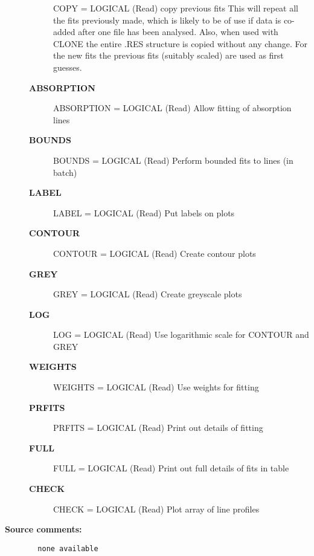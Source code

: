 \begin{description}
\begin{description}
   COPY = LOGICAL (Read)
        copy previous fits
        This will repeat all the fits previously made, which
        is likely to be of use if data is co-added after one
        file has been analysed. Also, when used with CLONE
        the entire .RES structure is copied without any change.
        For the new fits the previous fits (suitably scaled)
        are used as first guesses.
\item [{\bf ABSORPTION}]
   ABSORPTION = LOGICAL (Read)
        Allow fitting of absorption lines
\item [{\bf BOUNDS}]
   BOUNDS = LOGICAL (Read)
        Perform bounded fits to lines (in batch)
\item [{\bf LABEL}]
   LABEL = LOGICAL (Read)
        Put labels on plots
\item [{\bf CONTOUR}]
   CONTOUR = LOGICAL (Read)
        Create contour plots
\item [{\bf GREY}]
   GREY = LOGICAL (Read)
        Create greyscale plots
\item [{\bf LOG}]
   LOG = LOGICAL (Read)
        Use logarithmic scale for CONTOUR and GREY
\item [{\bf WEIGHTS}]
   WEIGHTS = LOGICAL (Read)
        Use weights for fitting
\item [{\bf PRFITS}]
   PRFITS = LOGICAL (Read)
        Print out details of fitting
\item [{\bf FULL}]
   FULL = LOGICAL (Read)
        Print out full details of fits in table
\item [{\bf CHECK}]
   CHECK = LOGICAL (Read)
        Plot array of line profiles
\end{description}

\item [{\bf Source comments:}]
\begin{verbatim}
  none available

\end{verbatim}
\end{description}
